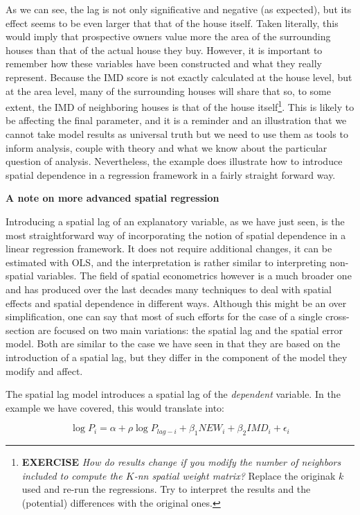 \documentclass[
]{book}
\begin{document}
As we can see, the lag is not only significative and negative (as expected), but its effect seems to be even larger that that of the house itself. Taken literally, this would imply that prospective owners value more the area of the surrounding houses than that of the actual house they buy. However, it is important to remember how these variables have been constructed and what they really represent. Because the IMD score is not exactly calculated at the house level, but at the area level, many of the surrounding houses will share that so, to some extent, the IMD of neighboring houses is that of the house itself\footnote{\textbf{EXERCISE} \emph{How do results change if you modify the number of neighbors included to compute the \(K\)-nn spatial weight matrix?} Replace the originak \(k\) used and re-run the regressions. Try to interpret the results and the (potential) differences with the original ones.}. This is likely to be affecting the final parameter, and it is a reminder and an illustration that we cannot take model results as universal truth but we need to use them as tools to inform analysis, couple with theory and what we know about the particular question of analysis. Nevertheless, the example does illustrate how to introduce spatial dependence in a regression framework in a fairly straight forward way.

\textbf{A note on more advanced spatial regression}

Introducing a spatial lag of an explanatory variable, as we have just seen, is the most straightforward way of incorporating the notion of spatial dependence in a linear regression framework. It does not require additional changes, it can be estimated with OLS, and the interpretation is rather similar to interpreting non-spatial variables. The field of spatial econometrics however is a much broader one and has produced over the last decades many techniques to deal with spatial effects and spatial dependence in different ways. Although this might be an over simplification, one can say that most of such efforts for the case of a single cross-section are focused on two main variations: the spatial lag and the spatial error model. Both are similar to the case we have seen in that they are based on the introduction of a spatial lag, but they differ in the component of the model they modify and affect.

The spatial lag model introduces a spatial lag of the \emph{dependent} variable. In the example we have covered, this would translate into:

\[
\log{P_i} = \alpha + \rho \log{P_{lag-i}} + \beta_{1} NEW_i + \beta_{2} IMD_i + \epsilon_i
\]
\end{document}
